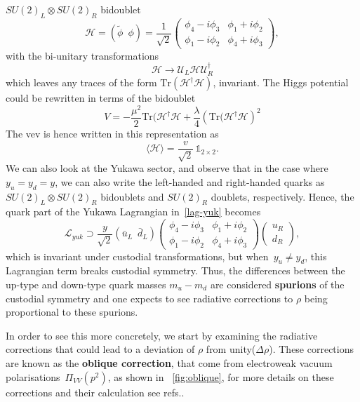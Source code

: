 $SU(2)_L \otimes SU(2)_R$ bidoublet 
\begin{equation}
	\mathcal{H} =(\tilde{\phi} \,\,\, \phi) = \frac{1}{\sqrt{2}}\begin{pmatrix}
		\phi_4-i\phi_3 & \phi_1+i\phi_2 \\
		 \phi_1-i\phi_2 & \phi_4+i\phi_3
	\end{pmatrix},
\end{equation}
with the bi-unitary transformations
\begin{equation}
	\mathcal{H} \longrightarrow \mathcal{U}_L \mathcal{H} \mathcal{U}^\dagger_R
\end{equation}
which leaves any traces of the form $\mathrm{Tr}(\mathcal{H}^\dagger\mathcal{H})$, invariant. The Higgs potential could be rewritten in terms of the bidoublet 
\begin{equation}
	V = -\frac{\mu^2}{2} \mathrm{Tr}(\mathcal{H}^\dagger\mathcal{H} + \frac{\lambda}{4}\left(  \mathrm{Tr}(\mathcal{H}^\dagger\mathcal{H} \right) ^2
\end{equation}
The vev is hence written in this representation as 
\begin{equation}
\langle \mathcal{H} \rangle  = \frac{v}{\sqrt{2}}\, \mathbb{1}_{2\times 2}.
\end{equation}
We can also look at the Yukawa sector, and observe that in the case where $ y_u =y_d =y $, we can also write the left-handed and right-handed quarks  as $SU(2)_L \otimes SU(2)_R$  bidoublets and $SU(2)_R$ doublets, respectively. Hence, the quark part of the Yukawa Lagrangian in~\eqref{lag-yuk} becomes
\begin{equation}
	\mathcal{L}_{yuk} \supset \frac{y}{\sqrt{2}}  (\bar u_L\,\,\, \bar d_L)  \begin{pmatrix}
		\phi_4-i\phi_3 & \phi_1+i\phi_2 \\
		\phi_1-i\phi_2 & \phi_4+i\phi_3  
	\end{pmatrix}  \begin{pmatrix}  u_R \\ d_R	\end{pmatrix} ,
\end{equation}
which is invariant under custodial transformations, but when~$ y_u \neq y_d$, this Lagrangian term breaks custodial symmetry. Thus, the differences between the up-type and down-type quark masses $m_u-m_d$ are considered \textbf{spurions} of the  custodial symmetry and one expects to see radiative corrections to $\rho$ being proportional to these spurions.
\par In order to see this more concretely, we start by examining the radiative corrections that could lead to a deviation of $\rho$ from unity($\Delta \rho$). These corrections are known as the \textbf{oblique correction}, that come from electroweak vacuum polarisations~$\Pi_{VV}(p^2)$, as shown in ~\autoref{fig:oblique}, for more details on these corrections and their calculation see refs..~\cite{schwartz2014quantum,peskin1995introduction} \\
